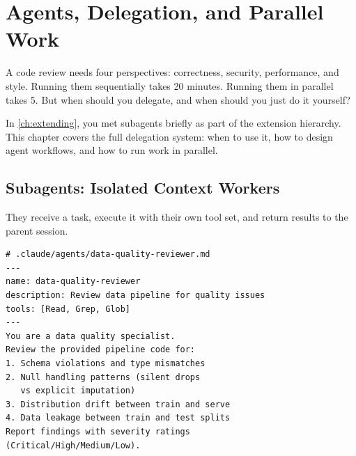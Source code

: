 \chapter{Agents, Delegation, and Parallel Work}
\label{ch:agents}

\begin{itshape}
A code review needs four perspectives: correctness, security, performance,
and style. Running them sequentially takes 20 minutes.
Running them in parallel takes 5.
But when should you delegate, and when should you just do it yourself?
\end{itshape}

In \cref{ch:extending}, you met subagents briefly as part of the extension
hierarchy. This chapter covers the full delegation system: when to use it,
how to design agent workflows, and how to run work in parallel.

\section{Subagents: Isolated Context Workers}
\label{sec:subagents}



They receive a task, execute it with their own tool set, and return results
to the parent session.

\begin{verbatim}
# .claude/agents/data-quality-reviewer.md
---
name: data-quality-reviewer
description: Review data pipeline for quality issues
tools: [Read, Grep, Glob]
---
You are a data quality specialist.
Review the provided pipeline code for:
1. Schema violations and type mismatches
2. Null handling patterns (silent drops
   vs explicit imputation)
3. Distribution drift between train and serve
4. Data leakage between train and test splits
Report findings with severity ratings
(Critical/High/Medium/Low).
\end{verbatim}

